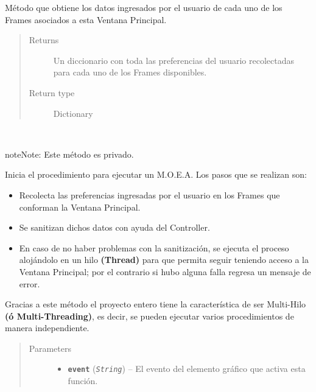 \documentclass[class=report, crop=false]{standalone}
\begin{document}
\begin{fulllineitems}
\begin{fulllineitems}
Método que obtiene los datos ingresados por el usuario
de cada uno de los Frames asociados a esta Ventana Principal.

\begin{quote}\begin{description}
\item[{Returns}] \leavevmode
Un diccionario con toda las preferencias del usuario recolectadas para cada uno de los Frames disponibles.
\item[{Return type}] \leavevmode
Dictionary
\end{description}\end{quote}

\end{fulllineitems}

\begin{fulllineitems}

~

\begin{notice}{note}{Note:}
Este método es privado.
\end{notice}

Inicia el procedimiento para ejecutar un M.O.E.A.\break
Los pasos que se realizan son:

\begin{itemize}
\item Recolecta las preferencias ingresadas por el usuario en los Frames que conforman la Ventana Principal.
\item Se sanitizan dichos datos con ayuda del Controller.
\item En caso de no haber problemas con la sanitización, se ejecuta el proceso alojándolo en un hilo \textbf{(Thread)} para que permita seguir teniendo acceso a la Ventana Principal; por el contrario si hubo alguna falla regresa un mensaje de error.
\end{itemize}

Gracias a este método el proyecto entero tiene la característica 
de ser Multi-Hilo \textbf{(ó Multi-Threading)}, es decir, se pueden 
ejecutar varios procedimientos de manera independiente.

\begin{quote}\begin{description}
\item[{Parameters}] \leavevmode\begin{itemize}
\item\textbf{\texttt{event}} (\emph{\texttt{String}}) -- El evento del elemento gráfico que activa esta función.
\end{itemize}
\end{description}\end{quote}


\end{fulllineitems}
\end{fulllineitems}
\end{document}
